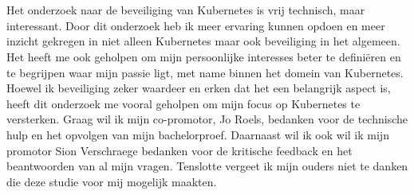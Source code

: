 
\chapter*{}%
\label{ch:voorwoord}


Het onderzoek naar de beveiliging van Kubernetes is vrij technisch, maar interessant. Door dit onderzoek heb ik meer ervaring kunnen opdoen en meer inzicht gekregen in niet alleen Kubernetes maar ook beveiliging in het algemeen. Het heeft me ook geholpen om mijn persoonlijke interesses beter te definiëren en te begrijpen waar mijn passie ligt, met name binnen het domein van Kubernetes. Hoewel ik beveiliging zeker waardeer en erken dat het een belangrijk aspect is, heeft dit onderzoek me vooral geholpen om mijn focus op Kubernetes te versterken. Graag wil ik mijn co-promotor, Jo Roels, bedanken voor de technische hulp en het opvolgen van mijn bachelorproef. Daarnaast wil ik ook wil ik mijn promotor Sion Verschraege bedanken voor de kritische feedback en het beantwoorden van al mijn vragen. Tenslotte vergeet ik mijn ouders niet te danken die deze studie voor mij mogelijk maakten.


